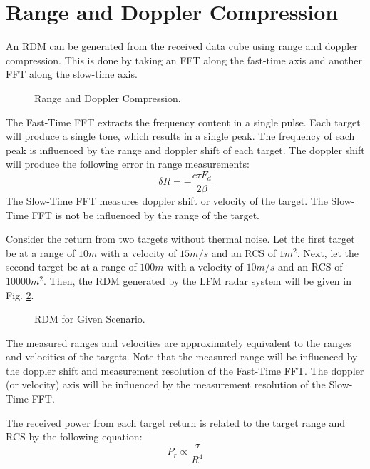 \documentclass[conference]{IEEEtran}
\begin{document}
\section{Range and Doppler Compression}
An RDM can be generated from the received data cube using range and doppler compression. This is done by taking an FFT along the fast-time axis and another FFT along the slow-time axis.
\begin{figure}[H]
\centerline{}
\caption{Range and Doppler Compression.}
\label{RDM}
\end{figure}
\noindent
The Fast-Time FFT extracts the frequency content in a single pulse. Each target will produce a single tone, which results in a single peak. The frequency of each peak is influenced by the range and doppler shift of each target. The doppler shift will produce the following error in range measurements:
\begin{equation}
\delta R = -\frac{c\tau F_d}{2\beta}
\end{equation}
The Slow-Time FFT measures doppler shift or velocity of the target. The Slow-Time FFT is not be influenced by the range of the target.
\par
Consider the return from two targets without thermal noise. Let the first target be at a range of $10m$ with a velocity of $15m/s$ and an RCS of $1m^2$. Next, let the second target be at a range of $100m$ with a velocity of $10m/s$ and an RCS of $10000m^2$. Then, the RDM generated by the LFM radar system will be given in Fig. \ref{RDM0}.
\begin{figure}[H]
\centerline{}
\caption{RDM for Given Scenario.}
\label{RDM0}
\end{figure}
The measured ranges and velocities are approximately equivalent to the ranges and velocities of the targets. Note that the measured range will be influenced by the doppler shift and measurement resolution of the Fast-Time FFT. The doppler (or velocity) axis will be influenced by the measurement resolution of the Slow-Time FFT.
\par
The received power from each target return is related to the target range and RCS by the following equation:
\begin{equation}
P_r \propto \frac{\sigma}{R^4}
\end{equation}
\end{document}

